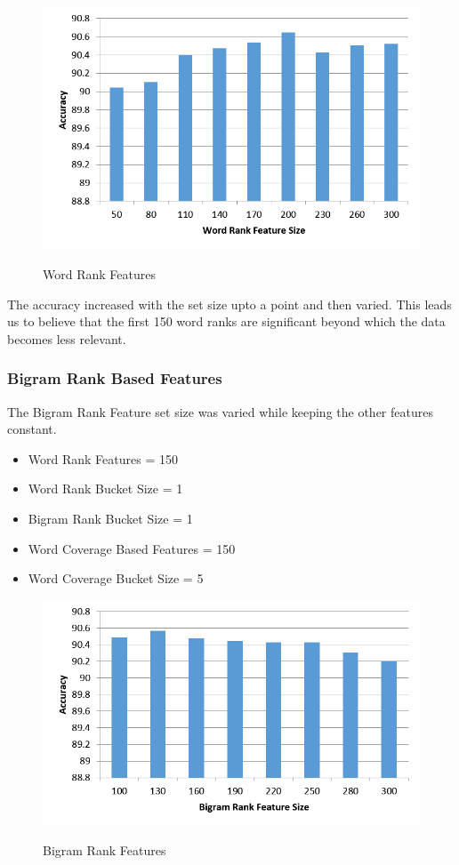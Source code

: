 \documentclass[a4paper,10pt]{report}
\begin{document}
\begin{figure}[h!]
\centering
\includegraphics[width=\textwidth]{./diagrams/wrf}\\
\caption{Word Rank Features}
\end{figure}

\noindent The accuracy increased with the set size upto a point and then varied. This leads us to believe that the first 150 word ranks are significant beyond which the data becomes less relevant.

\clearpage
\subsubsection{Bigram Rank Based Features}

The Bigram Rank Feature set size was varied while keeping the other features constant.

\begin{itemize}
\item Word Rank Features = 150
\item Word Rank Bucket Size = 1
\item Bigram Rank Bucket Size = 1
\item Word Coverage Based Features = 150
\item Word Coverage Bucket Size = 5
\end{itemize}

\begin{figure}[h!]
\centering
\includegraphics[width=\textwidth]{./diagrams/brf}\\
\caption{Bigram Rank Features}
\end{figure}
\end{document}
